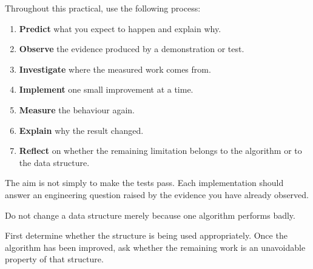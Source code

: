\documentclass{csc2059practical}
\begin{document}


Throughout this practical, use the following process:

\begin{enumerate}
    \item \textbf{Predict} what you expect to happen and explain why.
    \item \textbf{Observe} the evidence produced by a demonstration or test.
    \item \textbf{Investigate} where the measured work comes from.
    \item \textbf{Implement} one small improvement at a time.
    \item \textbf{Measure} the behaviour again.
    \item \textbf{Explain} why the result changed.
    \item \textbf{Reflect} on whether the remaining limitation belongs to the
          algorithm or to the data structure.
\end{enumerate}

The aim is not simply to make the tests pass. Each implementation should answer
an engineering question raised by the evidence you have already observed.
\clearpage
\begin{importantnote}
Do not change a data structure merely because one algorithm performs badly.

First determine whether the structure is being used appropriately. Once the
algorithm has been improved, ask whether the remaining work is an unavoidable
property of that structure.
\end{importantnote}



\end{document}
